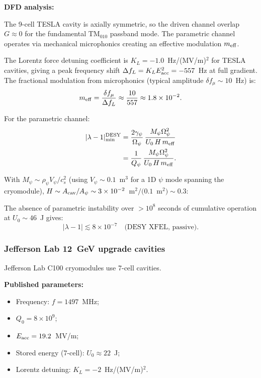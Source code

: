 \documentclass[12pt,aps,prd,twocolumn,superscriptaddress,nofootinbib]{revtex4-2}
\newcommand{\Opsi}{\Omega_\psi}
\newcommand{\gpsi}{\gamma_\psi}
\newcommand{\Mpsi}{M_\psi}
\newcommand{\lmin}{|\lambda-1|_{\mathrm{min}}}
\begin{document}
\textbf{DFD analysis:}

The 9-cell TESLA cavity is axially symmetric, so the driven channel
overlap $G \approx 0$ for the fundamental TM$_{010}$ passband mode.
The parametric channel operates via mechanical microphonics creating
an effective modulation $m_{\rm eff}$.

The Lorentz force detuning coefficient is
$K_L = -1.0$~Hz/(MV/m)$^2$ for TESLA cavities, giving a peak
frequency shift $\Delta f_L = K_L E_{\rm acc}^2 = -557$~Hz at
full gradient.  The fractional modulation from microphonics
(typical amplitude $\delta f_\mu \sim 10$~Hz) is:
\begin{equation}
m_{\rm eff} = \frac{\delta f_\mu}{\Delta f_L} \approx \frac{10}{557}
\approx 1.8\times10^{-2}.
\label{eq:m_desy}
\end{equation}

For the parametric channel:
\begin{align}
\lmin^{\rm DESY} &= \frac{2\gpsi}{\Opsi}\,
\frac{\Mpsi\Opsi^2}{U_0\,H\,m_{\rm eff}}
\nonumber\\
&= \frac{1}{Q_\psi}\,\frac{\Mpsi\Opsi^2}{U_0\,H\,m_{\rm eff}}.
\label{eq:desy_bound}
\end{align}

With $\Mpsi \sim \rho_\psi V_\psi/c_s^2$ (using $V_\psi \sim 0.1$~m$^3$
for a 1D $\psi$ mode spanning the cryomodule), $H \sim A_{\rm cav}/A_\psi
\sim 3\times10^{-2}$~m$^2/(0.1$~m$^2) \sim 0.3$:

The absence of parametric instability over $>10^8$ seconds of
cumulative operation at $U_0 \sim 46$~J gives:
\begin{equation}
\boxed{|\lambda-1| \lesssim 8\times10^{-7}
\quad\text{(DESY XFEL, passive)}.}
\label{eq:desy_result}
\end{equation}

\subsubsection{Jefferson Lab 12~GeV upgrade cavities}
\label{sec:jlab}

Jefferson Lab C100 cryomodules use 7-cell cavities.

\textbf{Published parameters:}
\begin{itemize}[noitemsep]
\item Frequency: $f = 1497$~MHz;
\item $Q_0 = 8\times10^{9}$;
\item $E_{\rm acc} = 19.2$~MV/m;
\item Stored energy (7-cell): $U_0 \approx 22$~J;
\item Lorentz detuning: $K_L = -2$~Hz/(MV/m)$^2$.
\end{itemize}
\end{document}
